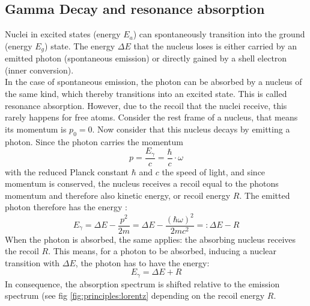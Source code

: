 \subsection{Gamma Decay and resonance absorption}
Nuclei in excited states (energy $E_a$) can spontaneously transition into the ground (energy $E_g$) state. The energy $\Delta E$ that the nucleus loses is either carried by an emitted photon (spontaneous emission) or directly gained by a shell electron (inner conversion). \\
In the case of spontaneous emission, the photon can be absorbed by a nucleus of the same kind, which thereby transitions into an excited state. This is called resonance absorption. However, due to the recoil that the nuclei receive, this rarely happens for free atoms.
Consider the rest frame of a nucleus, that means its momentum is $p_0 = 0$. Now consider that this nucleus decays by emitting a photon. Since the photon carries the momentum 
\begin{equation}
 p = \frac{E_\gamma}{c}= \frac{\hbar}{c}\cdot \omega
\label{eq:momentum}
\end{equation}
with the reduced Planck constant $\hbar$ and $c$ the speed of light, and since momentum is conserved, the nucleus receives a recoil equal to the photons momentum and therefore also kinetic energy, or recoil energy $R$. The emitted photon therefore has the energy \cite{Eyges}:
\begin{equation}
E_\gamma=\Delta E - \frac{p^2}{2m} = \Delta E - \frac{(\hbar \omega)^2}{2mc^2} =:\Delta E-R
\label{eq:recoil:emission}
\end{equation}
When the photon is absorbed, the same applies: the absorbing nucleus receives the recoil $R$. This means, for a photon to be absorbed, inducing a nuclear transition with $\Delta E$, the photon has to have the energy:
\begin{equation}
E_\gamma=\Delta E + R
\label{eq:recoil:absorbtion}
\end{equation}
In consequence, the absorption spectrum is shifted relative to the emission spectrum (see fig \ref{fig:principles:lorentz} depending on the recoil energy $R$.

